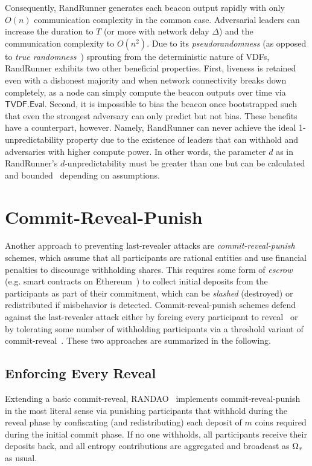 Consequently, RandRunner generates each beacon output rapidly with only $O(n)$ communication complexity in the common case. Adversarial leaders can increase the \epoch duration to $T$ (or more with network delay $\Delta$) and the communication complexity to $O(n^2)$. Due to its \textit{pseudorandomness} (as opposed to \textit{true randomness}~\cite{cascudomt, das2021spurt}) sprouting from the deterministic nature of VDFs, RandRunner exhibits two other beneficial properties. First, liveness is retained even with a dishonest majority and when network connectivity breaks down completely, as a node can simply compute the beacon outputs over time via $\mathsf{TVDF.Eval}$. Second, it is impossible to bias the beacon once bootstrapped such that even the strongest adversary can only predict but not bias. These benefits have a counterpart, however. Namely, RandRunner can never achieve the ideal 1-unpredictability property due to the existence of leaders that can withhold and adversaries with higher compute power. In other words, the parameter $d$ as in RandRunner's $d$-unpredictability must be greater than one but can be calculated and bounded~\cite{schindler2021randrunner} depending on assumptions.

\section{Commit-Reveal-Punish}
\label{section:commit-reveal-punish}
Another approach to preventing last-revealer attacks are \textit{commit-reveal-punish} schemes, which assume that all participants are rational entities and use financial penalties to discourage withholding shares. This requires some form of \textit{escrow} (e.g. smart contracts on Ethereum~\cite{wood2014ethereum}) to collect initial deposits from the participants as part of their commitment, which can be \emph{slashed} (destroyed) or redistributed if misbehavior is detected. Commit-reveal-punish schemes defend against the last-revealer attack either by forcing every participant to reveal~\cite{youcai2017randao, andrychowicz2014secure, bentov2014use} or by tolerating some number of withholding participants via a threshold variant of commit-reveal~\cite{david2020economically}. These two approaches are summarized in the following.

\subsection{Enforcing Every Reveal}
Extending a basic commit-reveal, RANDAO~\cite{youcai2017randao} implements commit-reveal-punish in the most literal sense via punishing participants that withhold during the reveal phase by confiscating (and redistributing) each deposit of $m$ coins required during the initial commit phase. If no one withholds, all participants receive their deposits back, and all entropy contributions are aggregated and broadcast as $\Omega_\tau$ as usual.

